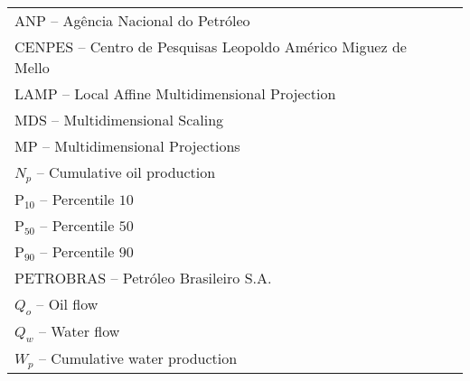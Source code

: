
\begin{thenotations}

  \noindent
  \begin{tabular}{ll}
    ANP -- Agência Nacional do Petróleo\\
    CENPES -- Centro de Pesquisas Leopoldo Américo Miguez de Mello\\
    LAMP -- Local Affine Multidimensional Projection\\
    MDS -- Multidimensional Scaling\\
    MP -- Multidimensional Projections\\
    $N_p$ -- Cumulative oil production\\
    P$_{10}$ -- Percentile $10$\\
    P$_{50}$ -- Percentile $50$\\
    P$_{90}$ -- Percentile $90$\\
    PETROBRAS -- Petróleo Brasileiro S.A.\\
    $Q_o$ -- Oil flow\\
    $Q_w$ -- Water flow\\
    $W_p$ -- Cumulative water production\\
  \end{tabular}

\end{thenotations}